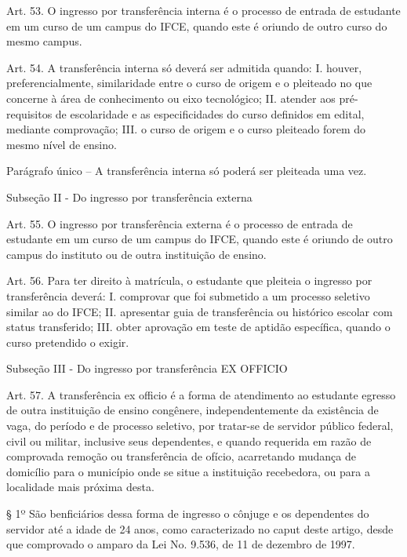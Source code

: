{Art. 53. O ingresso por transferência interna é o processo de entrada de estudante em um curso de um campus do IFCE, quando este é oriundo de outro curso do mesmo campus.

Art. 54. A transferência interna só deverá ser admitida quando:
I. houver, preferencialmente, similaridade entre o curso de origem e o pleiteado no que concerne à área de conhecimento ou eixo tecnológico;
II. atender aos pré-requisitos de escolaridade e as especificidades do curso definidos em edital, mediante comprovação;
III. o curso de origem e o curso pleiteado forem do mesmo nível de ensino.

Parágrafo único – A transferência interna só poderá ser pleiteada uma vez.

\begin{center}
	Subseção II - Do ingresso por transferência externa
\end{center}

Art. 55. O ingresso por transferência externa é o processo de entrada de estudante em um curso de um campus do IFCE, quando este é oriundo de outro campus do instituto ou de outra instituição de ensino.

Art. 56. Para ter direito à matrícula, o estudante que pleiteia o ingresso por transferência deverá:
I. comprovar que foi submetido a um processo seletivo similar ao do IFCE;
II. apresentar guia de transferência ou histórico escolar com status transferido;
III. obter aprovação em teste de aptidão específica, quando o curso pretendido o exigir.

\begin{center}
	Subseção III - Do ingresso por transferência EX OFFICIO
\end{center}

Art. 57. A transferência ex officio é a forma de atendimento ao estudante egresso de outra instituição de ensino congênere, independentemente da existência de vaga, do período e de processo seletivo, por tratar-se de servidor público federal, civil ou militar, inclusive seus dependentes, e quando requerida em razão de comprovada remoção ou transferência de ofício, acarretando mudança de domicílio para o município onde se situe a instituição recebedora, ou para a localidade mais próxima desta.

§ 1º São benficiários dessa forma de ingresso o cônjuge e os dependentes do servidor até a idade de 24 anos, como caracterizado no caput deste artigo, desde que comprovado o amparo da Lei No. 9.536, de 11 de dezembro de 1997.

}
